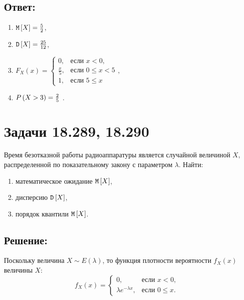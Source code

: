 \subsection*{Ответ:}
\begin{enumerate}
    \item $\mathtt{M} \left [ X \right ] = \frac{5}{2}$,
    \item $\mathtt{D} \left [ X \right ] = \frac{25}{12}$,
    \item
    $
    F_X(x)
    = \left \{
    \begin{array}{ll}
        0,           & \text{если } x < 0,      \\
        \frac{x}{5}, & \text{если } 0 \le x < 5 \\
        1,           & \text{если } 5 \le x
    \end{array}
    \right .
    ,
    $
    \item $P \left ( X > 3 \right ) = \frac{2}{5}$ .
\end{enumerate}

\section*{Задачи 18.289, 18.290}

Время безотказной работы радиоаппаратуры является случайной величиной $X$, распределенной по показательному закону с параметром $\lambda$. Найти:
\begin{enumerate}
    \item математическое ожидание $\mathtt{M} \left [ X \right ]$,
    \item дисперсию $\mathtt{D} \left [ X \right ]$,
    \item порядок квантили $\mathtt{M} \left [ X \right ]$.
\end{enumerate}

\subsection*{Решение:}

Поскольку величина $X \sim E(\lambda)$, то функция плотности вероятности $f_X(x)$ величины $X$:
\begin{equation}
    f_X(x) =
    \left \{
    \begin{array}{ll}
        0,                      & \text{если } x < 0,    \\
        \lambda e^{-\lambda x}, & \text{если } 0 \le x .
    \end{array}
    \right .
\end{equation}

